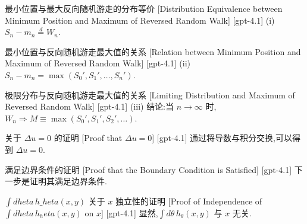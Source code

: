\documentclass[UTF8]{ctexart}
\begin{document}
    
    
    \begin{thm}
        {最小位置与最大反向随机游走的分布等价}
        [Distribution Equivalence between Minimum Position and Maximum of Reversed Random Walk]
        [gpt-4.1]
        (i) $S_n - m_n \overset{d}{=} W_n$.
    \end{thm}
    
    
    
    \begin{thm}
        {最小位置与反向随机游走最大值的关系}
        [Relation between Minimum Position and Maximum of Reversed Random Walk]
        [gpt-4.1]
        (ii) $S_n - m_n = \operatorname*{max}(S_0', S_1', \ldots, S_n')$.
    \end{thm}
    
    
    
    \begin{crl}
        {极限分布与反向随机游走最大值的关系}
        [Limiting Distribution and Maximum of Reversed Random Walk]
        [gpt-4.1]
        (iii) 结论:当 $n \to \infty$ 时,$W_n \Rightarrow M \equiv \operatorname*{max}(S_0', S_1', S_2', \ldots)$.
    \end{crl}
    
    
    
    \begin{prf}
        [Proof-that-$\Delta-u-=-0$]
        {关于 $\Delta u = 0$ 的证明}
        [Proof that $\Delta u = 0$]
        [gpt-4.1]
        通过将导数与积分交换,可以得到 $\Delta u = 0$.
    \end{prf}
    
    
    
    \begin{prf}
        {满足边界条件的证明}
        [Proof that the Boundary Condition is Satisfied]
        [gpt-4.1]
        下一步是证明其满足边界条件.
    \end{prf}
    
    
    
    \begin{prf}
        {$\int d	heta\, h\_	heta(x, y)$ 关于 $x$ 独立性的证明}
        [Proof of Independence of $\int d	heta\, h_	heta(x, y)$ on $x$]
        [gpt-4.1]
        显然,$\int d\theta\, h_\theta(x, y)$ 与 $x$ 无关.
    \end{prf}
    
\end{document}
